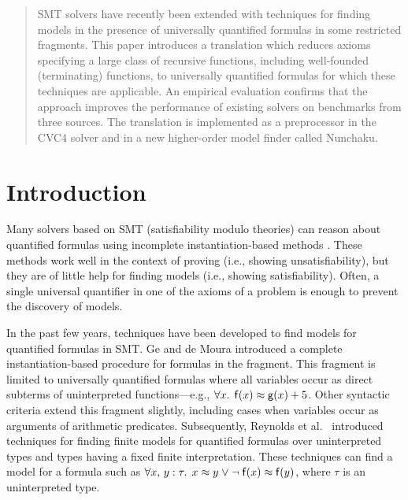 \maketitle

\setcounter{footnote}{0}

\begin{abstract}
\noindent
SMT solvers have recently been extended with techniques for finding models
in the presence of universally quantified formulas in some restricted fragments.
This paper introduces a translation which reduces axioms specifying a large
class of recursive functions, including well-founded (terminating) functions,
to universally quantified formulas for which these
techniques are applicable.
An empirical evaluation confirms that the approach improves
the performance of existing solvers on benchmarks from three sources.
The translation is implemented as a preprocessor in the CVC4 solver
and in a new higher-order model finder called Nunchaku.
\end{abstract}

\section{Introduction}
\label{sec:introduction}

Many solvers based on SMT (satisfiability modulo theories) can reason about
quantified formulas using incomplete instantiation-based methods
\cite{MouraBjoerner07,ReynoldsTinelliMoura14}.
These methods work well in the context of proving (i.e., showing
unsatisfiability), but they are of little help for finding models (i.e.,
showing satisfiability). Often, a single universal quantifier in one of the
axioms of a problem is enough to prevent the discovery of models.

In the past few years, techniques have been developed to find models for
quantified formulas in SMT.
Ge and de Moura \cite{GeDeM-CAV-09} introduced a complete instantiation-based
procedure for formulas in the  fragment.
This fragment is limited to universally quantified formulas where all
variables occur as direct subterms of uninterpreted
functions---e.g., $\forall x%
.\;\, \con{f}( x )
\teq \con{g}( x ) + 5$.
Other syntactic criteria extend
this fragment slightly, including cases when variables occur as arguments of
arithmetic predicates. Subsequently, Reynolds et al.\
\cite{ReyEtAl-1-RR-13,reynolds-et-al-2013} introduced techniques for finding finite
models for quantified
formulas over uninterpreted types and types having a fixed finite
interpretation. %
These techniques can
find a model for a formula such as $\forall x,\, y : \tau.\;\, x \teq
y \vee \allowbreak \neg \con{f}( x ) \teq \con{f}( y )$, where $\tau$ is an uninterpreted type.

